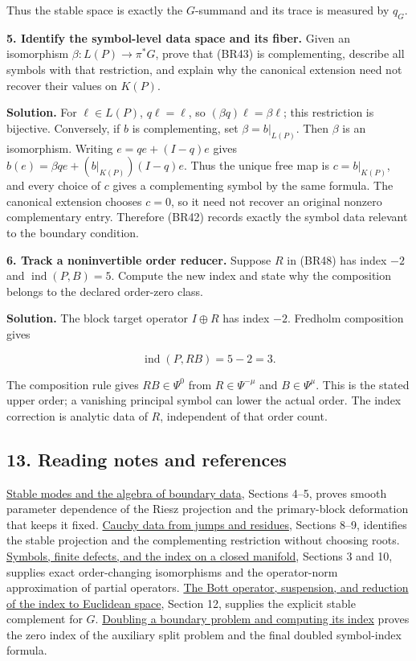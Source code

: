 \documentclass[
  11pt,
]{article}
\begin{document}
Thus the stable space is exactly the \(G\)-summand and its trace is
measured by \(q_G\).

\textbf{5. Identify the symbol-level data space and its fiber.} Given an
isomorphism \(\beta:L(P)\to\pi^*G\), prove that (BR43) is complementing,
describe all symbols with that restriction, and explain why the
canonical extension need not recover their values on \(K(P)\).

\textbf{Solution.} For \(\ell\in L(P)\), \(q\ell=\ell\), so
\((\beta q)\ell=\beta\ell\); this restriction is bijective. Conversely,
if \(b\) is complementing, set \(\beta=b|_{L(P)}\). Then \(\beta\) is an
isomorphism. Writing \(e=qe+(I-q)e\) gives
\(b(e)=\beta qe+(b|_{K(P)})(I-q)e\). Thus the unique free map is
\(c=b|_{K(P)}\), and every choice of \(c\) gives a complementing symbol
by the same formula. The canonical extension chooses \(c=0\), so it need
not recover an original nonzero complementary entry. Therefore (BR42)
records exactly the symbol data relevant to the boundary condition.

\textbf{6. Track a noninvertible order reducer.} Suppose \(R\) in (BR48)
has index \(-2\) and \(\operatorname{ind}(P,B)=5\). Compute the new
index and state why the composition belongs to the declared order-zero
class.

\textbf{Solution.} The block target operator \(I\oplus R\) has index
\(-2\). Fredholm composition gives

\[
 \operatorname{ind}(P,RB)=5-2=3.
 \tag{BR56}
\]

The composition rule gives \(RB\in\Psi^0\) from \(R\in\Psi^{-\mu}\) and
\(B\in\Psi^\mu\). This is the stated upper order; a vanishing principal
symbol can lower the actual order. The index correction is analytic data
of \(R\), independent of that order count.

\subsection{13. Reading notes and
references}\label{reading-notes-and-references}

\href{stable-boundary-models.pdf}{Stable modes and the algebra of
boundary data}, Sections 4--5, proves smooth parameter dependence of the
Riesz projection and the primary-block deformation that keeps it fixed.
\href{calderon-cauchy-data.pdf}{Cauchy data from jumps and residues},
Sections 8--9, identifies the stable projection and the complementing
restriction without choosing roots.
\href{global-elliptic-symbol-index.pdf}{Symbols, finite defects, and the
index on a closed manifold}, Sections 3 and 10, supplies exact
order-changing isomorphisms and the operator-norm approximation of
partial operators. \href{bott-suspension.pdf}{The Bott operator,
suspension, and reduction of the index to Euclidean space}, Section 12,
supplies the explicit stable complement for \(G\).
\href{split-doubling-boundary-index.pdf}{Doubling a boundary problem and
computing its index} proves the zero index of the auxiliary split
problem and the final doubled symbol-index formula.
\end{document}
